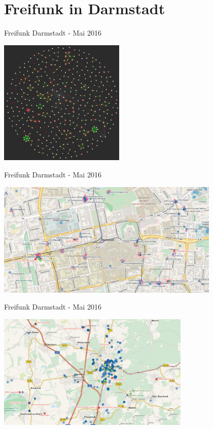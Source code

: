 \documentclass[10pt]{beamer}
\begin{document}
  \section{Freifunk in Darmstadt}
  
  \begin{frame}{Freifunk Darmstadt - Mai 2016}
    \begin{center}
      \includegraphics[height=6cm]{images/mesh_big}\\
    \end{center}
  \end{frame}
  
  \begin{frame}{Freifunk Darmstadt - Mai 2016}
    \begin{center}
      \includegraphics[height=5.5cm]{images/2016-05_map-innenstadt}\\
    \end{center}
  \end{frame}
  
  \begin{frame}{Freifunk Darmstadt - Mai 2016}
    \begin{center}
      \includegraphics[height=5.5cm]{images/2016-05_map-umland}\\
    \end{center}
  \end{frame}
  
\end{document}
